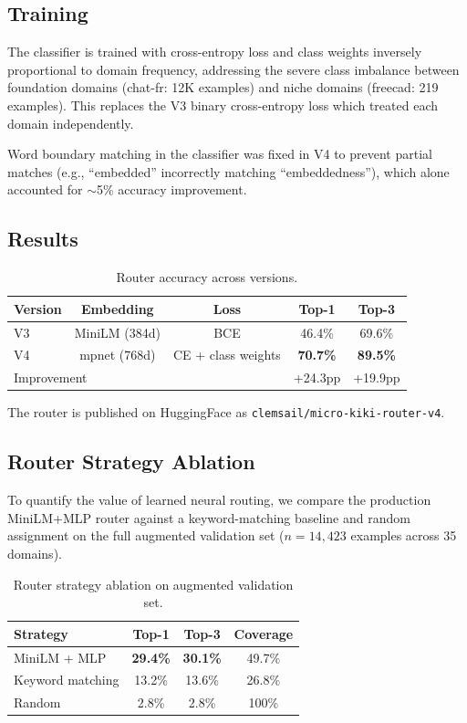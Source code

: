 \documentclass[11pt,a4paper]{article}
\begin{document}
\subsection{Training}

The classifier is trained with cross-entropy loss and class weights inversely proportional to domain frequency, addressing the severe class imbalance between foundation domains (chat-fr: 12K examples) and niche domains (freecad: 219 examples). This replaces the V3 binary cross-entropy loss which treated each domain independently.

Word boundary matching in the classifier was fixed in V4 to prevent partial matches (e.g., ``embedded'' incorrectly matching ``embeddedness''), which alone accounted for $\sim$5\% accuracy improvement.

\subsection{Results}

\begin{table}[h]
\centering
\caption{Router accuracy across versions.}
\label{tab:router}
\begin{tabular}{lcccc}
\toprule
\textbf{Version} & \textbf{Embedding} & \textbf{Loss} & \textbf{Top-1} & \textbf{Top-3} \\
\midrule
V3 & MiniLM (384d) & BCE & 46.4\% & 69.6\% \\
V4 & mpnet (768d) & CE + class weights & \textbf{70.7\%} & \textbf{89.5\%} \\
\midrule
\multicolumn{3}{l}{Improvement} & +24.3pp & +19.9pp \\
\bottomrule
\end{tabular}
\end{table}

The router is published on HuggingFace as \texttt{clemsail/micro-kiki-router-v4}.

\subsection{Router Strategy Ablation}

To quantify the value of learned neural routing, we compare the production MiniLM+MLP router against a keyword-matching baseline and random assignment on the full augmented validation set ($n=14{,}423$ examples across 35 domains).

\begin{table}[h]
\centering
\caption{Router strategy ablation on augmented validation set.}
\label{tab:router-ablation}
\begin{tabular}{lccc}
\toprule
\textbf{Strategy} & \textbf{Top-1} & \textbf{Top-3} & \textbf{Coverage} \\
\midrule
MiniLM + MLP & \textbf{29.4\%} & \textbf{30.1\%} & 49.7\% \\
Keyword matching & 13.2\% & 13.6\% & 26.8\% \\
Random & 2.8\% & 2.8\% & 100\% \\
\bottomrule
\end{tabular}
\end{table}
\end{document}
